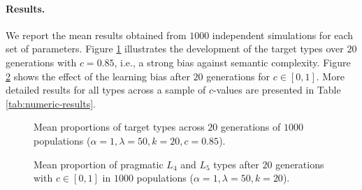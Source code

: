 \documentclass[10pt,a4paper]{article}
\begin{document}
\paragraph{Results.} We report the mean results obtained from $1000$ independent simulations for each set of parameters. Figure \ref{fig:c-85} illustrates the development of the target types over $20$ generations with $c = 0.85$, i.e., a strong bias against semantic complexity. Figure \ref{fig:cost} shows the effect of the learning bias after $20$ generations for $c \in [0,1]$. More detailed results for all types across a sample of $c$-values are presented in Table \ref{tab:numeric-results}.
\begin{figure}[t] %
	\centering
	\caption{Mean proportions of target types across $20$ generations of $1000$ populations ($\alpha = 1, \lambda = 50, k = 20, c = 0.85$).}
	\label{fig:c-85}
\end{figure}

\begin{figure}[t] %
	\centering
	\caption{Mean proportion of pragmatic $L_4$ and $L_5$ types after $20$ generations with $c \in [0,1]$ in $1000$ populations ($\alpha = 1, \lambda = 50, k = 20$).}
	\label{fig:cost}
\end{figure}
\end{document}
